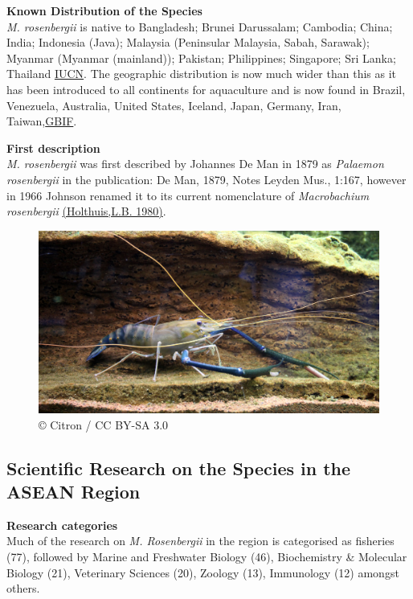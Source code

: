\documentclass[]{book}
\theoremstyle{definition}
\theoremstyle{definition}
\theoremstyle{definition}
\theoremstyle{remark}
\begin{document}
\textbf{Known Distribution of the Species}\\
\emph{M. rosenbergii} is native to Bangladesh; Brunei Darussalam;
Cambodia; China; India; Indonesia (Java); Malaysia (Peninsular Malaysia,
Sabah, Sarawak); Myanmar (Myanmar (mainland)); Pakistan; Philippines;
Singapore; Sri Lanka; Thailand
\href{http://www.iucnredlist.org/details/197873/0}{IUCN}. The geographic
distribution is now much wider than this as it has been introduced to
all continents for aquaculture and is now found in Brazil, Venezuela,
Australia, United States, Iceland, Japan, Germany, Iran,
Taiwan,\href{https://www.gbif.org/species/2224546}{GBIF}.

\textbf{First description}\\
\emph{M. rosenbergii} was first described by Johannes De Man in 1879 as
\emph{Palaemon rosenbergii} in the publication: De Man, 1879, Notes
Leyden Mus., 1:167, however in 1966 Johnson renamed it to its current
nomenclature of \emph{Macrobachium rosenbergii}
\href{http://www.fao.org/fi/oldsite/eims_search/advanced_s_result.asp?JOB_NO=AC477}{(Holthuis,L.B.
1980)}.

\begin{figure}
\centering
\includegraphics{images_species/Macrobrachium_rosenbergii.jpg}
\caption{© Citron / CC BY-SA 3.0}
\end{figure}

\hypertarget{scientific-research-on-the-species-in-the-asean-region-1}{%
\subsection{Scientific Research on the Species in the ASEAN
Region}\label{scientific-research-on-the-species-in-the-asean-region-1}}

\textbf{Research categories}\\
Much of the research on \emph{M. Rosenbergii} in the region is
categorised as fisheries (77), followed by Marine and Freshwater Biology
(46), Biochemistry \& Molecular Biology (21), Veterinary Sciences (20),
Zoology (13), Immunology (12) amongst others.
\end{document}

